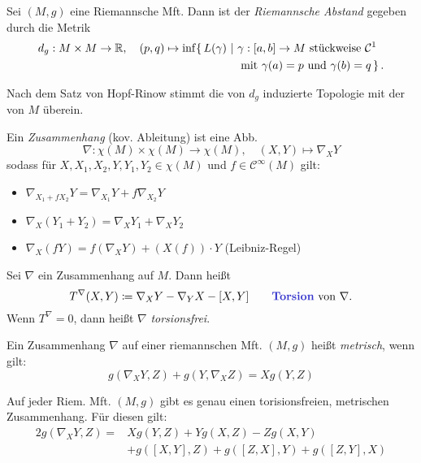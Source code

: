 \documentclass{cheat-sheet}
\begin{document}
\begin{defn}
  Sei $(M, g)$ eine Riemannsche Mft. Dann ist der \emph{Riemannsche Abstand} gegeben durch die Metrik
  \begin{align*}
    d_g : M \times M \to \mathbb{R}, \quad
    (p, q) \mapsto \inf \{\, L(\gamma) \,\,|\,\, & \gamma : \left[ a, b \right] \to M \text{ stückweise } \mathcal{C}^{1}\\
    & \left. \text{mit $\gamma(a) = p$ und $\gamma(b) = q$} \, \right\}.
  \end{align*}
\end{defn}

\begin{bem}
  Nach dem Satz von Hopf-Rinow stimmt die von $d_g$ induzierte Topologie mit der von $M$ überein.
\end{bem}


\begin{defn}
  Ein \emph{Zusammenhang} (kov. Ableitung) ist eine Abb.
  \[
    \nabla : \chi(M) \times \chi(M) \to \chi(M), \quad
    (X, Y) \mapsto \nabla_X Y
  \]
  sodass für $X, X_1, X_2, Y, Y_1, Y_2 \in \chi(M)$ und $f \in \mathcal{C}^\infty(M)$ gilt:
  \begin{itemize}
    \item $\nabla_{X_1 + f X_2} Y = \nabla_{X_1} Y + f \nabla_{X_2} Y$
    \item $\nabla_X (Y_1 + Y_2) = \nabla_X Y_1 + \nabla_X Y_2$
    \item $\nabla_X (f Y) = f \left( \nabla_X Y \right) + (X(f)) \cdot Y$ (Leibniz-Regel)
  \end{itemize}
\end{defn}

\begin{defn}
  Sei $\nabla$ ein Zusammenhang auf $M$. Dann heißt
  \[
    T^\nabla(X, Y) \coloneqq \nabla_X Y - \nabla_Y X - [X, Y]
    \qquad \text{\emph{Torsion} von $\nabla$.}
  \]
  Wenn $T^\nabla = 0$, dann heißt $\nabla$ \emph{torsionsfrei}.
\end{defn}

\begin{defn}
  Ein Zusammenhang $\nabla$ auf einer riemannschen Mft. $(M, g)$ heißt \emph{metrisch}, wenn gilt:
  \[ g(\nabla_X Y, Z) + g(Y, \nabla_X Z) = X g(Y, Z) \]
\end{defn}

\begin{thm}
  Auf jeder Riem. Mft. $(M, g)$ gibt es genau einen torisionsfreien, metrischen Zusammenhang. Für diesen gilt:
  \begin{align*}
    2 g(\nabla_X Y, Z) = & X g(Y, Z) + Y g(X, Z) - Z g(X, Y)\\
    & + g([X, Y], Z) + g([Z, X], Y) + g([Z, Y], X)
  \end{align*}
\end{thm}
\end{document}
